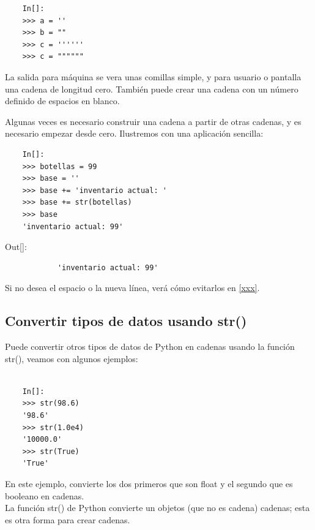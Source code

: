 \begin{lstlisting}
	In[]:
	>>> a = ''
	>>> b = ""
	>>> c = ''''''
	>>> c = """"""
\end{lstlisting}

La salida para máquina se vera unas comillas simple, y para usuario o pantalla una cadena de longitud cero.
También puede crear una cadena con un número definido de espacios en blanco.

Algunas veces es necesario  construir una cadena a partir de otras cadenas, y es necesario empezar desde cero.
Ilustremos con una aplicación sencilla:

\begin{lstlisting} 
	In[]:	
	>>> botellas = 99
	>>> base = ''
	>>> base += 'inventario actual: '
	>>> base += str(botellas)
	>>> base
	'inventario actual: 99'
\end{lstlisting}

{\ttfamily\scriptsize\scriptsize 
	\hspace{-0.65cm}Out[]:\vspace{-0.15cm}	
	{\color{blue} 	
		\begin{verbatim}
			'inventario actual: 99'
		\end{verbatim}
}}       



Si no desea el espacio o la nueva línea, verá cómo evitarlos en \ref{xxx}.



\subsection{Convertir tipos de datos usando str()}

Puede convertir otros tipos de datos de Python en cadenas usando la  función {\ttfamily  str()}, veamos con algunos ejemplos:

\begin{lstlisting} 
	
	In[]:
	>>> str(98.6)
	'98.6'
	>>> str(1.0e4)
	'10000.0'
	>>> str(True)
	'True'
\end{lstlisting}

En este ejemplo, convierte los dos primeros que son  float y el segundo que es  booleano en cadenas.\\

La función {\ttfamily str()} de Python convierte un objetos (que no es cadena) cadenas; esta es otra forma para crear cadenas.



